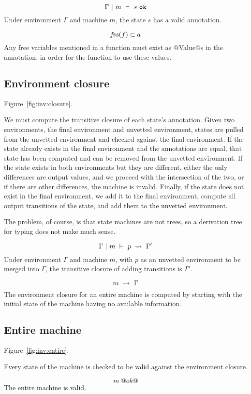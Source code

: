 $$ \Gamma ~|~ m ~\vdash~ s~\mathtt{ok} $$
Under environment $\Gamma$ and machine $m$, the state $s$ has a valid annotation.

$$ \mathit{fvs}(f) \subset a $$
Any free variables mentioned in a function must exist as @Value@s in the annotation, in order for the function to use these values.

\subsection{Environment closure}
Figure~\ref{fig:inv:closure}.

We must compute the transitive closure of each state's annotation.
Given two environments, the final environment and unvetted environment, states are pulled from the unvetted environment and checked against the final environment.
If the state already exists in the final environment and the annotations are equal, that state has been computed and can be removed from the unvetted environment.
If the state exists in both environments but they are different, either the only differences are output values, and we proceed with the intersection of the two, or if there are other differences, the machine is invalid.
Finally, if the state does not exist in the final environment, we add it to the final environment, compute all output transitions of the state, and add them to the unvetted environment.

The problem, of course, is that state machines are not trees, so a derivation tree for typing does not make much sense.

$$ \Gamma ~|~ m ~\vdash~ p ~\rightsquigarrow~ \Gamma' $$
Under environment $\Gamma$ and machine $m$, with $p$ as an unvetted environment to be merged into $\Gamma$, the transitive closure of adding transitions is $\Gamma'$.

$$ m ~\rightsquigarrow~ \Gamma $$
The environment closure for an entire machine is computed by starting with the initial state of the machine having no available information.

\subsection{Entire machine}
Figure~\ref{fig:inv:entire}.

Every state of the machine is checked to be valid against the environment closure.

$$ m~@ok@ $$
The entire machine is valid.


